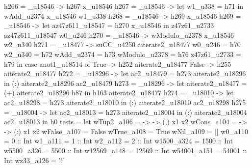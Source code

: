                                                         h266 = \x_u18546 -> h267 x_u18546
                                                        h267 = \x_u18546 -> let w1_u338 = h71
                                                                            in wAdd_u2374 x_u18546 w1_u338
                                                        h268 = \x_u18546 -> h269 x_u18546
                                                        h269 = \x_u18546 -> let
                                                                              az47z611_u18547 = h270 x_u18546
                                                                            in z47z61_u2733 az47z611_u18547 w0_u246
                                                        h270 = \x_u18546 -> wModulo_u2378 x_u18546 w2_u340
                                                        h271 = _u18477 -> suCC_u4250 aiterate2_u18477
                                                        w0_u246 = h70
                                                        w2_u340 = h72
                                                        wAdd_u2374 = h73
                                                        wModulo_u2378 = h76
                                                        z47z61_u2733 = h79
                                                      in case anot1_u18514 of
                                                           True -> h252 aiterate2_u18477
                                                           False -> h255 aiterate2_u18477
         h272 = _u18296 -> let ac2_u18479 = h273 aiterate2_u18296
                                     in (:) aiterate2_u18296 ac2_u18479
         h273 = _u18296 -> let
                                       aiterate2_u18477 = (+) aiterate2_u18296 h87
                                     in h163 aiterate2_u18477
         h274 = _u18010 -> let ac2_u18298 = h273 aiterate2_u18010
                                     in (:) aiterate2_u18010 ac2_u18298
         h275 = _u18004 -> let ac2_u18013 = h273 aiterate2_u18004
                                     in (:) aiterate2_u18004 ac2_u18013
       in h0
tests = let
          wTup2_a106 =  ->  -> (,) x1 x2
          wCons_a104 =  ->  -> (:) x1 x2
          wFalse_a107 = False
          wTrue_a108 = True
          wNil_a109 = []
          w0_a110 = 0 :: Int
          w1_a111 = 1 :: Int
          w2_a112 = 2 :: Int
          w1500_a324 = 1500 :: Int
          w5500_a326 = 5500 :: Int
          w12569_a148 = 12569 :: Int
          w54001_a151 = 54001 :: Int
          wz33_a126 = '!'
